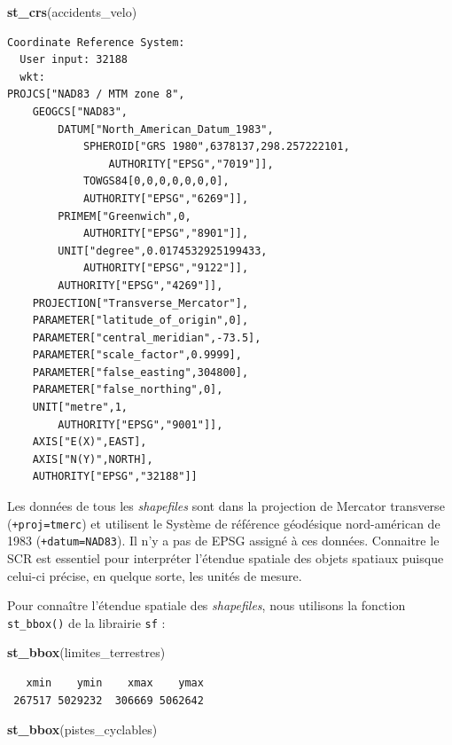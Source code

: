 \documentclass[
  12pt,
]{krantz}
\newenvironment{Shaded}{\begin{snugshade}}{\end{snugshade}}
\newcommand{\KeywordTok}[1]{\textcolor[rgb]{0.13,0.29,0.53}{\textbf{#1}}}
\newcommand{\NormalTok}[1]{#1}
\begin{document}
\begin{Shaded}
\begin{Highlighting}[]
\KeywordTok{st_crs}\NormalTok{(accidents_velo)}
\end{Highlighting}
\end{Shaded}

\begin{verbatim}
Coordinate Reference System:
  User input: 32188 
  wkt:
PROJCS["NAD83 / MTM zone 8",
    GEOGCS["NAD83",
        DATUM["North_American_Datum_1983",
            SPHEROID["GRS 1980",6378137,298.257222101,
                AUTHORITY["EPSG","7019"]],
            TOWGS84[0,0,0,0,0,0,0],
            AUTHORITY["EPSG","6269"]],
        PRIMEM["Greenwich",0,
            AUTHORITY["EPSG","8901"]],
        UNIT["degree",0.0174532925199433,
            AUTHORITY["EPSG","9122"]],
        AUTHORITY["EPSG","4269"]],
    PROJECTION["Transverse_Mercator"],
    PARAMETER["latitude_of_origin",0],
    PARAMETER["central_meridian",-73.5],
    PARAMETER["scale_factor",0.9999],
    PARAMETER["false_easting",304800],
    PARAMETER["false_northing",0],
    UNIT["metre",1,
        AUTHORITY["EPSG","9001"]],
    AXIS["E(X)",EAST],
    AXIS["N(Y)",NORTH],
    AUTHORITY["EPSG","32188"]]
\end{verbatim}

Les données de tous les \emph{shapefiles} sont dans la projection de Mercator transverse (\texttt{+proj=tmerc}) et utilisent le Système de référence géodésique nord-américan de 1983 (\texttt{+datum=NAD83}). Il n'y a pas de EPSG assigné à ces données. Connaitre le SCR est essentiel pour interpréter l'étendue spatiale des objets spatiaux puisque celui-ci précise, en quelque sorte, les unités de mesure.

Pour connaître l'étendue spatiale des \emph{shapefiles}, nous utilisons la fonction \texttt{st\_bbox()} de la librairie \texttt{sf} :

\begin{Shaded}
\begin{Highlighting}[]
\KeywordTok{st_bbox}\NormalTok{(limites_terrestres)}
\end{Highlighting}
\end{Shaded}

\begin{verbatim}
   xmin    ymin    xmax    ymax 
 267517 5029232  306669 5062642 
\end{verbatim}

\begin{Shaded}
\begin{Highlighting}[]
\KeywordTok{st_bbox}\NormalTok{(pistes_cyclables)}
\end{Highlighting}
\end{Shaded}
\end{document}
